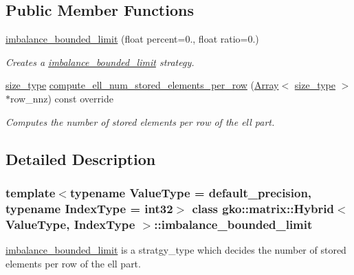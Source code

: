 \subsection*{Public Member Functions}
\begin{DoxyCompactItemize}
\item 
\mbox{\label{classgko_1_1matrix_1_1Hybrid_1_1imbalance__bounded__limit_ae190bc4cfbf6f570e93d9b885093cbb1}} 
\hyperlink{classgko_1_1matrix_1_1Hybrid_1_1imbalance__bounded__limit_ae190bc4cfbf6f570e93d9b885093cbb1}{imbalance\+\_\+bounded\+\_\+limit} (float percent=0., float ratio=0.)
\begin{DoxyCompactList}\small\item\em Creates a \hyperlink{classgko_1_1matrix_1_1Hybrid_1_1imbalance__bounded__limit}{imbalance\+\_\+bounded\+\_\+limit} strategy. \end{DoxyCompactList}\item 
\hyperlink{namespacegko_a6e5c95df0ae4e47aab2f604a22d98ee7}{size\+\_\+type} \hyperlink{classgko_1_1matrix_1_1Hybrid_1_1imbalance__bounded__limit_ae68c0d740e1424f5cdb3be5919a856b8}{compute\+\_\+ell\+\_\+num\+\_\+stored\+\_\+elements\+\_\+per\+\_\+row} (\hyperlink{classgko_1_1Array}{Array}$<$ \hyperlink{namespacegko_a6e5c95df0ae4e47aab2f604a22d98ee7}{size\+\_\+type} $>$ $\ast$row\+\_\+nnz) const override
\begin{DoxyCompactList}\small\item\em Computes the number of stored elements per row of the ell part. \end{DoxyCompactList}\end{DoxyCompactItemize}


\subsection{Detailed Description}
\subsubsection*{template$<$typename Value\+Type = default\+\_\+precision, typename Index\+Type = int32$>$\newline
class gko\+::matrix\+::\+Hybrid$<$ Value\+Type, Index\+Type $>$\+::imbalance\+\_\+bounded\+\_\+limit}

\hyperlink{classgko_1_1matrix_1_1Hybrid_1_1imbalance__bounded__limit}{imbalance\+\_\+bounded\+\_\+limit} is a stratgy\+\_\+type which decides the number of stored elements per row of the ell part. 

